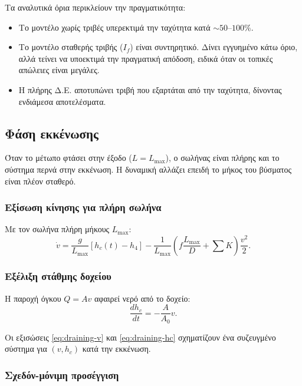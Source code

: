 \documentclass[11pt]{article}
\begin{document}
Τα αναλυτικά όρια περικλείουν την πραγματικότητα:
\begin{itemize}[nosep,leftmargin=2em]
  \item Το μοντέλο χωρίς τριβές υπερεκτιμά την ταχύτητα κατά $\sim 50$--$100\%$.
  \item Το μοντέλο σταθερής τριβής ($I_f$) είναι συντηρητικό. Δίνει εγγυημένο κάτω όριο, αλλά τείνει να υποεκτιμά την πραγματική απόδοση, ειδικά όταν οι τοπικές απώλειες είναι μεγάλες.
  \item Η πλήρης Δ.Ε. αποτυπώνει τριβή που εξαρτάται από την ταχύτητα, δίνοντας ενδιάμεσα αποτελέσματα.
\end{itemize}

\subsection{Φάση εκκένωσης}
\label{sec:draining}

Όταν το μέτωπο φτάσει στην έξοδο ($L = L_{\max}$), ο σωλήνας είναι πλήρης και το σύστημα περνά στην εκκένωση. Η δυναμική αλλάζει επειδή το μήκος του βύσματος είναι πλέον σταθερό.

\subsubsection{Εξίσωση κίνησης για πλήρη σωλήνα}

Με τον σωλήνα πλήρη μήκους $L_{\max}$:
\begin{equation}
  \dot{v} = \frac{g}{L_{\max}}[h_c(t) - h_4] - \frac{1}{L_{\max}}\left(f\frac{L_{\max}}{D} + \sum K\right)\frac{v^2}{2}.
  \label{eq:draining-v}
\end{equation}

\subsubsection{Εξέλιξη στάθμης δοχείου}

Η παροχή όγκου $Q = Av$ αφαιρεί νερό από το δοχείο:
\begin{equation}
  \frac{dh_c}{dt} = -\frac{A}{A_0}v.
  \label{eq:draining-hc}
\end{equation}

Οι εξισώσεις \eqref{eq:draining-v} και \eqref{eq:draining-hc} σχηματίζουν ένα συζευγμένο σύστημα για $(v, h_c)$ κατά την εκκένωση.

\subsubsection{Σχεδόν-μόνιμη προσέγγιση}
\end{document}
